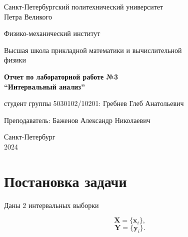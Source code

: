 \documentclass{article}
\begin{document}
  \begin{titlepage}
    \begin{center}
      Санкт-Петербургский политехнический университет \\Петра Великого
    \end{center}

    \begin{center}
      Физико-механический институт
    \end{center}

    \begin{center}
      Высшая школа прикладной математики и вычислительной\\ физики
    \end{center}

    \vspace{8em}

    \begin{center}
      \textbf{Отчет по лабораторной работе №3}\\
      \textbf{“Интервальный анализ”}
    \end{center}

    \vspace{\fill}

    \begin{flushright}
       студент группы 5030102/10201:
      \hfill
      Гребнев Глеб Анатольевич \\
    \end{flushright}
    Преподаватель: \hfill Баженов Александр Николаевич

    \vspace{12em}

    \begin{center}
      Санкт-Петербург\\
      2024
    \end{center}
  \end{titlepage}

  \tableofcontents

  \newpage

  \section{Постановка задачи}

  Даны 2 интервальных выборки

  \begin{equation}
    \mathbf{X} = \{ \mathbf{x}_i \},
  \end{equation}
  \begin{equation}
    \mathbf{Y} = \{ \mathbf{y}_i \}.
  \end{equation}
\end{document}
